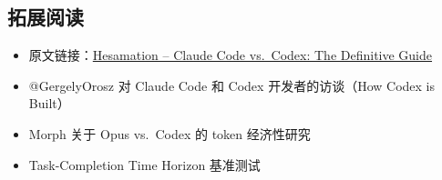\subsection{拓展阅读}

\begin{itemize}
    \item 原文链接：\href{https://x.com/Hesamation/status/2031418875946958915}{Hesamation -- Claude Code vs.\ Codex: The Definitive Guide}
    \item @GergelyOrosz 对 Claude Code 和 Codex 开发者的访谈（How Codex is Built）
    \item Morph 关于 Opus vs.\ Codex 的 token 经济性研究
    \item Task-Completion Time Horizon 基准测试
\end{itemize}



